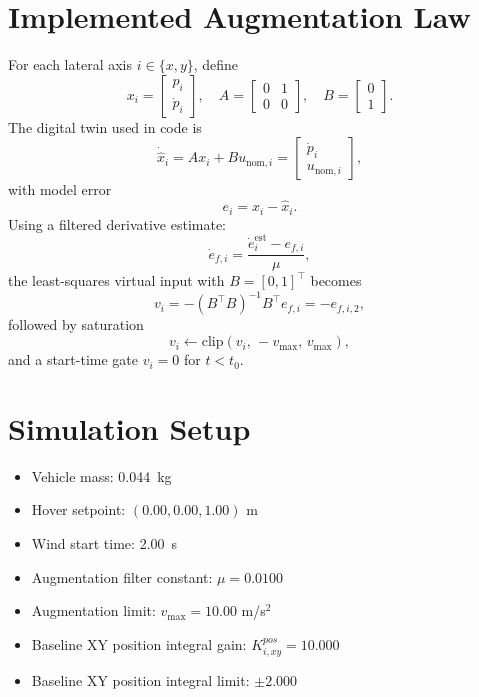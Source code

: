 \documentclass[11pt]{article}
\begin{document}
\section{Implemented Augmentation Law}
For each lateral axis $i\in\{x,y\}$, define
\begin{equation}
x_i = \begin{bmatrix} p_i \\ \dot p_i \end{bmatrix}, \quad
A=\begin{bmatrix}0&1\\0&0\end{bmatrix}, \quad
B=\begin{bmatrix}0\\1\end{bmatrix}.
\end{equation}
The digital twin used in code is
\begin{equation}
\dot{\hat{x}}_i = A x_i + B u_{\mathrm{nom},i}
= \begin{bmatrix}\dot p_i\\u_{\mathrm{nom},i}\end{bmatrix},
\end{equation}
with model error
\begin{equation}
e_i = x_i - \hat{x}_i.
\end{equation}
Using a filtered derivative estimate:
\begin{equation}
\dot e_{f,i} = \frac{\dot e_i^{\mathrm{est}} - e_{f,i}}{\mu},
\end{equation}
the least-squares virtual input with $B=[0,1]^\top$ becomes
\begin{equation}
v_i = - (B^\top B)^{-1} B^\top e_{f,i} = -e_{f,i,2},
\end{equation}
followed by saturation
\begin{equation}
v_i \leftarrow \mathrm{clip}(v_i,\,-v_{\max},\,v_{\max}),
\end{equation}
and a start-time gate $v_i=0$ for $t<t_0$.

\section{Simulation Setup}
\begin{itemize}
\item Vehicle mass: \SI{0.044}{kg}
\item Hover setpoint: $(0.00, 0.00, 1.00)$ m
\item Wind start time: \SI{2.00}{s}
\item Augmentation filter constant: $\mu=0.0100$
\item Augmentation limit: $v_{\max}=10.00$ m/s$^2$
\item Baseline XY position integral gain: $K_{i,xy}^{pos}=10.000$
\item Baseline XY position integral limit: $\pm 2.000$
\end{itemize}
\end{document}
